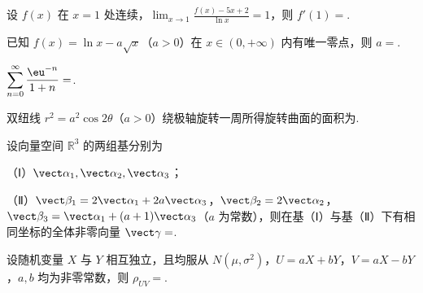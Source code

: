 \begin{question}[index=11]
设 $f(x)$ 在 $x=1$ 处连续，$\displaystyle\lim_{x\to1}\frac{f(x)-5x+2}{\ln x}=1$，则 $f'(1)=$\fillin.
\end{question}
\QuestionBreak

\begin{question}[index=12]
已知 $f(x)=\ln x-a\sqrt x$（$a>0$）在 $x\in(0,+\infty)$ 内有唯一零点，则 $a=$\fillin.
\end{question}
\QuestionBreak

\begin{question}[index=13]
$\displaystyle\sum_{n=0}^\infty\frac{\eu^{-n}}{1+n}=$\fillin.
\end{question}
\QuestionBreak

\begin{question}[index=14]
双纽线 $r^2=a^2\cos2\theta$（$a>0$）绕极轴旋转一周所得旋转曲面的面积为\fillin.
\end{question}
\QuestionBreak

\begin{question}[index=15]
设向量空间 $\mathbb R^3$ 的两组基分别为
\par（Ⅰ）$\vect\alpha_1,\vect\alpha_2,\vect\alpha_3$；
\par（Ⅱ）$\vect\beta_1=2\vect\alpha_1+2a\vect\alpha_3$，$\vect\beta_2=2\vect\alpha_2$，$\vect\beta_3=\vect\alpha_1+(a+1)\vect\alpha_3$（$a$ 为常数），则在基（Ⅰ）与基（Ⅱ）下有相同坐标的全体非零向量 $\vect\gamma=$\fillin.
\end{question}
\QuestionBreak

\begin{question}[index=16]
设随机变量 $X$ 与 $Y$ 相互独立，且均服从 $N(\mu,\sigma^2)$，$U=aX+bY$，$V=aX-bY$，$a,b$ 均为非零常数，则 $\rho_{UV}=$\fillin.
\end{question}
